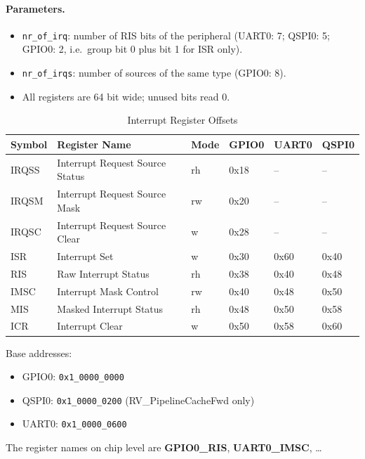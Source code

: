 \paragraph{Parameters.}
\begin{itemize}
  \item \texttt{nr\_of\_irq}: number of RIS bits of the peripheral
    (UART0: 7; QSPI0: 5; GPIO0: 2, i.e.\ group bit 0 plus bit 1 for ISR only).
  \item \texttt{nr\_of\_irqs}: number of sources of the same type (GPIO0: 8).
  \item All registers are 64 bit wide; unused bits read 0.
\end{itemize}

\begin{table}[H]
\caption{Interrupt Register Offsets}
\label{tab:archirq04}
\centering
\begin{tabularx}{\textwidth}{|l|X|l|l|l|l|}
  \hline
  Symbol & Register Name & Mode & GPIO0 & UART0 & QSPI0 \\
  \hline
  \hline
  IRQSS & Interrupt Request Source Status & rh & 0x18 & -- & -- \\
  \hline
  IRQSM & Interrupt Request Source Mask   & rw & 0x20 & -- & -- \\
  \hline
  IRQSC & Interrupt Request Source Clear  & w  & 0x28 & -- & -- \\
  \hline
  ISR   & Interrupt Set                   & w  & 0x30 & 0x60 & 0x40 \\
  \hline
  RIS   & Raw Interrupt Status            & rh & 0x38 & 0x40 & 0x48 \\
  \hline
  IMSC  & Interrupt Mask Control          & rw & 0x40 & 0x48 & 0x50 \\
  \hline
  MIS   & Masked Interrupt Status         & rh & 0x48 & 0x50 & 0x58 \\
  \hline
  ICR   & Interrupt Clear                 & w  & 0x50 & 0x58 & 0x60 \\
  \hline
\end{tabularx}
\end{table}
Base addresses:
\begin{itemize}
  \item GPIO0: \texttt{0x1\_0000\_0000}
  \item QSPI0: \texttt{0x1\_0000\_0200} (RV\_PipelineCacheFwd only)
  \item UART0: \texttt{0x1\_0000\_0600}
\end{itemize}
The register names on chip level are \textbf{GPIO0\_RIS}, \textbf{UART0\_IMSC}, \ldots{}

